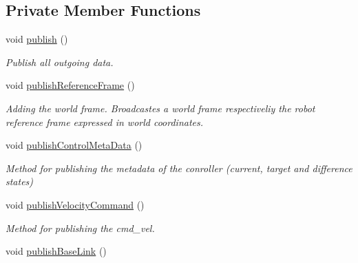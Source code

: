 \subsection*{Private Member Functions}
\begin{DoxyCompactItemize}
\item 
void \hyperlink{classController_ae6859e3a43be2fa31cb82ace3954e746}{publish} ()\hypertarget{classController_ae6859e3a43be2fa31cb82ace3954e746}{}\label{classController_ae6859e3a43be2fa31cb82ace3954e746}

\begin{DoxyCompactList}\small\item\em Publish all outgoing data. \end{DoxyCompactList}\item 
void \hyperlink{classController_a83ae87fa8558c5feb6875d1b49b18309}{publish\+Reference\+Frame} ()\hypertarget{classController_a83ae87fa8558c5feb6875d1b49b18309}{}\label{classController_a83ae87fa8558c5feb6875d1b49b18309}

\begin{DoxyCompactList}\small\item\em Adding the world frame. Broadcastes a world frame respectiveliy the robot reference frame expressed in world coordinates. \end{DoxyCompactList}\item 
void \hyperlink{classController_a3653ce8173f3eb07e4e395bcb8f3b58c}{publish\+Control\+Meta\+Data} ()\hypertarget{classController_a3653ce8173f3eb07e4e395bcb8f3b58c}{}\label{classController_a3653ce8173f3eb07e4e395bcb8f3b58c}

\begin{DoxyCompactList}\small\item\em Method for publishing the metadata of the conroller (current, target and difference states) \end{DoxyCompactList}\item 
void \hyperlink{classController_a3814e75cd4ffbae93750c9d5270029be}{publish\+Velocity\+Command} ()\hypertarget{classController_a3814e75cd4ffbae93750c9d5270029be}{}\label{classController_a3814e75cd4ffbae93750c9d5270029be}

\begin{DoxyCompactList}\small\item\em Method for publishing the cmd\+\_\+vel. \end{DoxyCompactList}\item 
void \hyperlink{classController_ae1dd78ce080b1797d5df67b3ebd6aa4f}{publish\+Base\+Link} ()\hypertarget{classController_ae1dd78ce080b1797d5df67b3ebd6aa4f}{}\label{classController_ae1dd78ce080b1797d5df67b3ebd6aa4f}


\end{DoxyCompactItemize}
